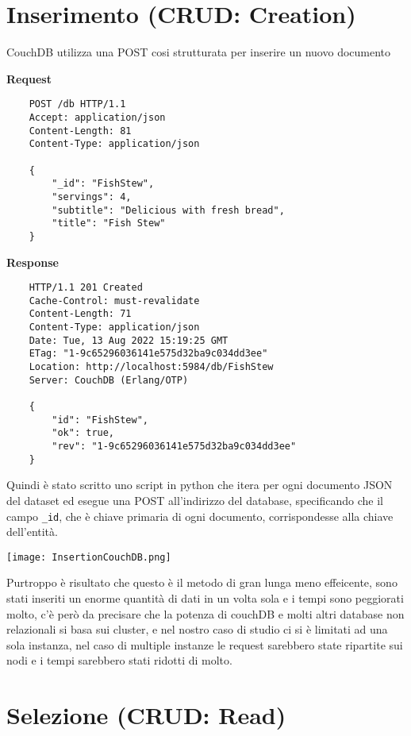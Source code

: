 \section{Inserimento (CRUD: Creation)}


CouchDB utilizza una POST cosi strutturata per inserire un nuovo documento 

\textbf{Request}

\begin{verbatim}
    POST /db HTTP/1.1
    Accept: application/json
    Content-Length: 81
    Content-Type: application/json

    {
        "_id": "FishStew",
        "servings": 4,
        "subtitle": "Delicious with fresh bread",
        "title": "Fish Stew"
    }
\end{verbatim}


\textbf{Response}

\begin{verbatim}
    HTTP/1.1 201 Created
    Cache-Control: must-revalidate
    Content-Length: 71
    Content-Type: application/json
    Date: Tue, 13 Aug 2022 15:19:25 GMT
    ETag: "1-9c65296036141e575d32ba9c034dd3ee"
    Location: http://localhost:5984/db/FishStew
    Server: CouchDB (Erlang/OTP)
    
    {
        "id": "FishStew",
        "ok": true,
        "rev": "1-9c65296036141e575d32ba9c034dd3ee"
    }
\end{verbatim}

Quindi è stato scritto uno script in python che itera per ogni documento JSON del dataset ed esegue una POST all'indirizzo del database, specificando che 
il campo \verb|_id|, che è chiave primaria di ogni documento, corrispondesse alla chiave dell'entità.

\begin{center}
    \texttt{[image: InsertionCouchDB.png]}
\end{center}



Purtroppo è risultato che questo è il metodo di gran lunga meno effeicente, sono stati inseriti un enorme quantità di dati in un volta sola e i tempi sono
peggiorati molto, c'è però da precisare che la potenza di couchDB e molti altri database non relazionali si basa sui cluster, e nel nostro caso di studio
ci si è limitati ad una sola instanza, nel caso di multiple instanze le request sarebbero state ripartite sui nodi e i tempi sarebbero stati ridotti di molto.

\section{Selezione (CRUD: Read)}


